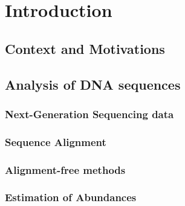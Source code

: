 
\chapter{Introduction} %
\label{Chapter1}

\section{Context and Motivations}

\section{Analysis of DNA sequences}

\subsection{Next-Generation Sequencing data}

\subsection{Sequence Alignment}

\subsection{Alignment-free methods}

\subsection{Estimation of Abundances}
